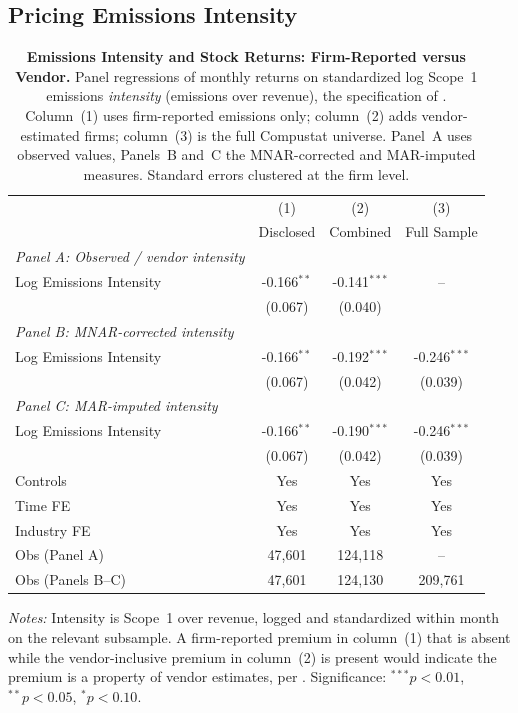 \documentclass[a4paper,12pt]{article}
\newcommand{\citet}[1]{\textcite{#1}}
\begin{document}
\clearpage

\subsection{Pricing Emissions Intensity}

\begin{table}[htbp]
\footnotesize\centering
\caption{\textbf{Emissions Intensity and Stock Returns: Firm-Reported versus Vendor.}
Panel regressions of monthly returns on standardized log Scope~1 emissions
\emph{intensity} (emissions over revenue), the specification of
\citet{aswani2024carbon}. Column~(1) uses firm-reported emissions only;
column~(2) adds vendor-estimated firms; column~(3) is the full Compustat
universe. Panel~A uses observed values, Panels~B and~C the MNAR-corrected and
MAR-imputed measures. Standard errors clustered at the firm level.}
\label{tab:returns_intensity}
\begin{tabular}{lccc}
\toprule
 & (1) & (2) & (3) \\
 & Disclosed & Combined & Full Sample \\
\midrule
\textit{Panel A: Observed / vendor intensity} & & & \\[2pt]
Log Emissions Intensity & -0.166$^{**}$ & -0.141$^{***}$ & -- \\
 & (0.067) & (0.040) & \\

\textit{Panel B: MNAR-corrected intensity} & & & \\[2pt]
Log Emissions Intensity & -0.166$^{**}$ & -0.192$^{***}$ & -0.246$^{***}$ \\
 & (0.067) & (0.042) & (0.039) \\

\textit{Panel C: MAR-imputed intensity} & & & \\[2pt]
Log Emissions Intensity & -0.166$^{**}$ & -0.190$^{***}$ & -0.246$^{***}$ \\
 & (0.067) & (0.042) & (0.039) \\
\midrule
Controls & Yes & Yes & Yes \\
Time FE & Yes & Yes & Yes \\
Industry FE & Yes & Yes & Yes \\
Obs (Panel A) & 47,601 & 124,118 & -- \\
Obs (Panels B--C) & 47,601 & 124,130 & 209,761 \\
\bottomrule
\end{tabular}
\begin{flushleft}\footnotesize
\textit{Notes:} Intensity is Scope~1 over revenue, logged and standardized within month on the relevant subsample. A firm-reported premium in column~(1)
that is absent while the vendor-inclusive premium in column~(2) is present would indicate the premium is a property of vendor estimates, per \citet{aswani2024carbon}. Significance: $^{***}p<0.01$, $^{**}p<0.05$, $^{*}p<0.10$.
\end{flushleft}
\end{table}
\end{document}
